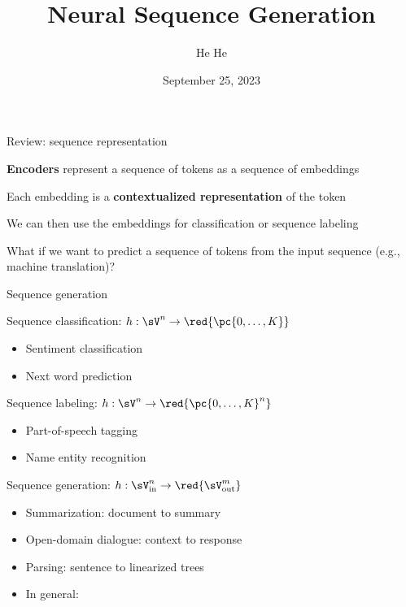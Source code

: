 \documentclass[usenames,dvipsnames,notes,11pt,aspectratio=169,hyperref={colorlinks=true, linkcolor=blue}]{beamer}
\title[DS-GA-1011]{Neural Sequence Generation}
\author[He He]{He He
}
\institute[NYU]{
    \texttt{[image: ../figures/nyu-logo]}\\
}
\date{September 25, 2023}
\begin{document}
\begin{frame}
\titlepage
\end{frame}


\begin{frame}
    {Review: sequence representation}
    \begin{wideitemize}
        \item {\bf Encoders} represent a sequence of tokens as a sequence of embeddings
        \item Each embedding is a {\bf contextualized representation} of the token
        \item We can then use the embeddings for classification or sequence labeling
        \item What if we want to predict a sequence of tokens from the input sequence (e.g., machine translation)?
    \end{wideitemize}
\end{frame}

\begin{frame}
    {Sequence generation}
    \begin{wideitemize}[<+->]
        \item Sequence classification: $h: \sV^n \rightarrow \red{\pc{0,\ldots,K}}$
            \begin{itemize}[<.->]
                \item Sentiment classification
                \item Next word prediction
            \end{itemize}
        \item Sequence labeling: $h: \sV^n \rightarrow \red{\pc{0,\ldots,K}^n}$
            \begin{itemize}[<.->]
                \item Part-of-speech tagging 
                \item Name entity recognition 
            \end{itemize}

        \item Sequence generation: $h: \sV_{\text{in}}^n \rightarrow \red{\sV_{\text{out}}^m}$
            \begin{itemize}[<.->]
                \item Summarization: document to summary
                \item Open-domain dialogue: context to response
                \item Parsing: sentence to linearized trees
                \item In general: 
            \end{itemize}
    \end{wideitemize}
   
\end{frame}
\end{document}
